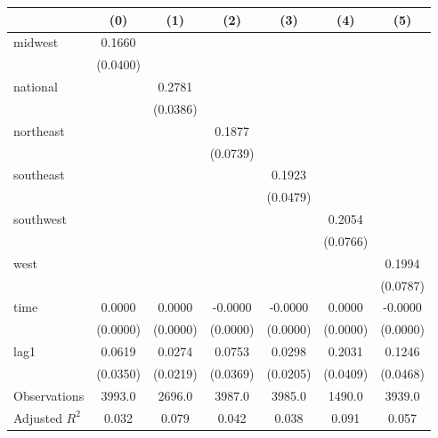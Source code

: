 \begin{tabular}{lcccccc}
\toprule
 & (0) & (1) & (2) & (3) & (4) & (5) \\
\midrule
midwest & 0.1660 &  &  &  &  &  \\
\vspace{0.2cm}
 & (0.0400) &  &  &  &  &  \\
national &  & 0.2781 &  &  &  &  \\
\vspace{0.2cm}
 &  & (0.0386) &  &  &  &  \\
northeast &  &  & 0.1877 &  &  &  \\
\vspace{0.2cm}
 &  &  & (0.0739) &  &  &  \\
southeast &  &  &  & 0.1923 &  &  \\
\vspace{0.2cm}
 &  &  &  & (0.0479) &  &  \\
southwest &  &  &  &  & 0.2054 &  \\
\vspace{0.2cm}
 &  &  &  &  & (0.0766) &  \\
west &  &  &  &  &  & 0.1994 \\
\vspace{0.2cm}
 &  &  &  &  &  & (0.0787) \\
time & 0.0000 & 0.0000 & -0.0000 & -0.0000 & 0.0000 & -0.0000 \\
\vspace{0.2cm}
 & (0.0000) & (0.0000) & (0.0000) & (0.0000) & (0.0000) & (0.0000) \\
lag1 & 0.0619 & 0.0274 & 0.0753 & 0.0298 & 0.2031 & 0.1246 \\
\vspace{0.2cm}
 & (0.0350) & (0.0219) & (0.0369) & (0.0205) & (0.0409) & (0.0468) \\
\midrule
Observations & 3993.0 & 2696.0 & 3987.0 & 3985.0 & 1490.0 & 3939.0 \\
Adjusted $R^2$ & 0.032 & 0.079 & 0.042 & 0.038 & 0.091 & 0.057 \\
\bottomrule
\end{tabular}
